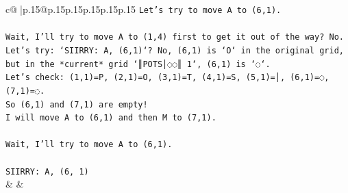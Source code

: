 \documentclass{article}
\begin{document}
{\begin{supertabular}{c@{$\;$}|p{.15\linewidth}@{}p{.15\linewidth}p{.15\linewidth}p{.15\linewidth}p{.15\linewidth}p{.15\linewidth}}
{{{\texttt{Let's try to move A to (6,1).} \\
\\ 
\texttt{Wait, I'll try to move A to (1,4) first to get it out of the way? No.} \\
\texttt{Let's try: `SIIRRY: A, (6,1)`? No, (6,1) is `O` in the original grid, but in the *current* grid `║POTS│◌◌║ 1`, (6,1) is `◌`.} \\
\texttt{Let's check: (1,1)=P, (2,1)=O, (3,1)=T, (4,1)=S, (5,1)=│, (6,1)=◌, (7,1)=◌.} \\
\texttt{So (6,1) and (7,1) are empty!} \\
\texttt{I will move A to (6,1) and then M to (7,1).} \\
\\ 
\texttt{Wait, I'll try to move A to (6,1).} \\
\\ 
\texttt{SIIRRY: A, (6, 1)} \\
            }
        }
    }
    & & \\ \\


\end{supertabular}}
\end{document}
